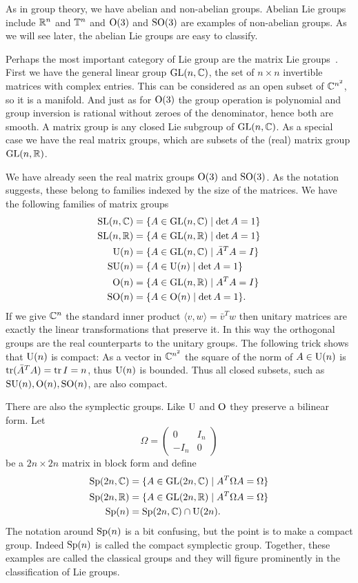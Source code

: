 As in group theory, we have abelian and non-abelian groups.
Abelian Lie groups include $\mathbb{R}^n$ and $\mathbb{T}^n$ and $\mathrm{O}(3)$ and $\mathrm{SO}(3)$ are examples of non-abelian groups.
As we will see later, the abelian Lie groups are easy to classify.

Perhaps the most important category of Lie group are the matrix Lie groups~\cite[Definition~1.4]{Hall2015}.
First we have the general linear group $\mathrm{GL}(n,\mathbb{C})$, the set of $n\times n$ invertible matrices with complex entries.
This can be considered as an open subset of $\mathbb{C}^{n^2}$, so it is a manifold. And just as for $\mathrm{O}(3)$ the group operation is polynomial and group inversion is rational without zeroes of the denominator, hence both are smooth.
A matrix group is any closed Lie subgroup of $\mathrm{GL}(n,\mathbb{C})$.
As a special case we have the real matrix groups, which are subsets of the (real) matrix group $\mathrm{GL}(n,\mathbb{R})$.

We have already seen the real matrix groups $\mathrm{O}(3)$ and $\mathrm{SO}(3)$.
As the notation suggests, these belong to families indexed by the size of the matrices.
We have the following families of matrix groups
\begin{align*}
\mathrm{SL}(n,\mathbb{C}) &= \{ A \in \mathrm{GL}(n,\mathbb{C}) \mid \det A = 1 \} \\
\mathrm{SL}(n,\mathbb{R}) &= \{ A \in \mathrm{GL}(n,\mathbb{R}) \mid \det A = 1 \} \\
\mathrm{U}(n) &= \{ A \in \mathrm{GL}(n,\mathbb{C}) \mid \bar{A}^T A = I \} \\
\mathrm{SU}(n) &= \{ A \in \mathrm{U}(n) \mid \det A = 1 \} \\
\mathrm{O}(n) &= \{ A \in \mathrm{GL}(n,\mathbb{R}) \mid A^T A = I \} \\
\mathrm{SO}(n) &= \{ A \in \mathrm{O}(n) \mid \det A = 1 \}.
\end{align*}
If we give $\mathbb{C}^n$ the standard inner product $\langle v,w \rangle = \bar{v}^Tw$ then unitary matrices are exactly the linear transformations that preserve it.
In this way the orthogonal groups are the real counterparts to the unitary groups.
The following trick shows that $\mathrm{U}(n)$ is compact: As a vector in $\mathbb{C}^{n^2}$ the square of the norm of $A \in \mathrm{U}(n)$ is $\operatorname{tr}(\bar{A}^T A) = \operatorname{tr} I = n$, thus $\mathrm{U}(n)$ is bounded.
Thus all closed subsets, such as $\mathrm{SU}(n), \mathrm{O}(n),\mathrm{SO}(n)$, are also compact.

There are also the symplectic groups.
Like $\mathrm{U}$ and $\mathrm{O}$ they preserve a bilinear form.
Let 
\[
\Omega = \begin{pmatrix}
0 & I_n \\ - I_n & 0
\end{pmatrix}
\]
be a $2n\times 2n$ matrix in block form and define
\begin{align*}
\mathrm{Sp}(2n,\mathbb{C}) &= \{ A \in \mathrm{GL}(2n,\mathbb{C}) \mid A^T\Omega A = \Omega \} \\
\mathrm{Sp}(2n,\mathbb{R}) &= \{ A \in \mathrm{GL}(2n,\mathbb{R}) \mid A^T\Omega A = \Omega \} \\
\mathrm{Sp}(n) &= \mathrm{Sp}(2n,\mathbb{C}) \cap \mathrm{U}(2n).
\end{align*}
The notation around $\mathrm{Sp}(n)$ is a bit confusing, but the point is to make a compact group.
Indeed $\mathrm{Sp}(n)$ is called the compact symplectic group.
Together, these examples are called the classical groups and they will figure prominently in the classification of Lie groups.


